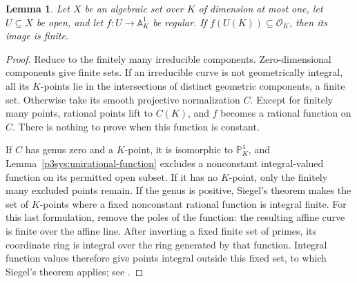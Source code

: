 \documentclass[11pt]{article}
\newtheorem{lemma}[theorem]{Lemma}
\theoremstyle{definition}
\begin{document}
\begin{lemma}\label{p3sys:curve-function}
Let $X$ be an algebraic set over $K$ of dimension at most one,
let $U\subseteq X$ be open, and let $f:U\to\mathbb A^1_K$ be
regular.  If $f(U(K))\subseteq\mathcal O_K$, then its image is
finite.
\end{lemma}
\begin{proof}
Reduce to the finitely many irreducible components.  Zero-dimensional
components give finite sets.  If an irreducible curve is not geometrically
integral, all its $K$-points lie in the intersections of distinct
geometric components, a finite set.  Otherwise take its smooth
projective normalization $C$.  Except for finitely many points, rational
points lift to $C(K)$, and $f$ becomes a rational function on $C$.
There is nothing to prove when this function is constant.

If $C$ has genus zero and a $K$-point, it is isomorphic to
$\mathbb P^1_K$, and Lemma~\ref{p3sys:unirational-function} excludes
a nonconstant integral-valued function on its permitted open subset.
If it has no $K$-point, only the finitely many excluded points remain.
If the genus is positive, Siegel's theorem makes the set of $K$-points
where a fixed nonconstant rational function is integral finite.
For this last formulation, remove the poles of the function: the
resulting affine curve is finite over the affine line.  After inverting
a fixed finite set of primes, its coordinate ring is integral over
the ring generated by that function.  Integral function values
therefore give points integral outside this fixed set, to which
Siegel's theorem applies; see \cite[Chapter~8]{lbLang1983}.
\end{proof}
\end{document}
